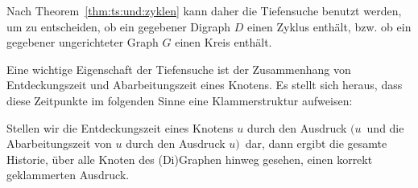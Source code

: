 \begin{bem}
Nach Theorem~\ref{thm:ts:und:zyklen} kann daher die Tiefensuche benutzt werden, um zu entscheiden, ob ein gegebener Digraph $D$ einen Zyklus enthält, bzw. ob ein gegebener ungerichteter Graph $G$ einen Kreis enthält.
\end{bem}


\begin{bem}
Eine wichtige Eigenschaft der Tiefensuche ist der Zusammenhang von Entdeckungszeit und Abarbeitungszeit eines Knotens. Es stellt sich heraus, dass diese Zeitpunkte im folgenden Sinne eine Klammerstruktur aufweisen:

Stellen wir die Entdeckungszeit eines Knotens $u$ durch den Ausdruck \glqq $(u$\grqq\ und die Abarbeitungszeit von $u$ durch den Ausdruck \glqq $u)$\grqq\ dar, dann ergibt die gesamte Historie, über alle Knoten des (Di)Graphen hinweg gesehen, einen korrekt geklammerten Ausdruck.
\end{bem}

